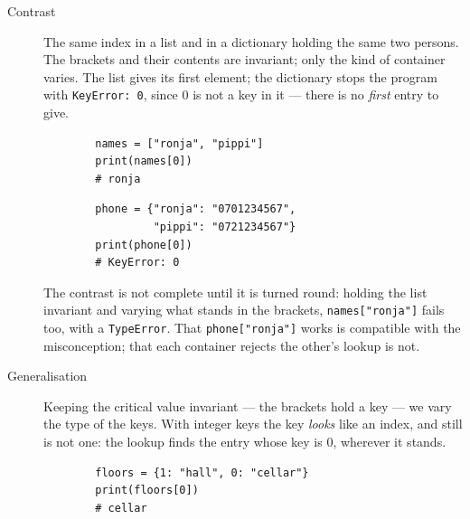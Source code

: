 \begin{description}
  \item[Contrast] The same index in a list and in a dictionary holding the
    same two persons. The brackets and their contents are invariant; only the
    kind of container varies. The list gives its first element; the dictionary
    stops the program with \texttt{KeyError: 0}, since 0 is not a
    key in it --- there is no \emph{first} entry to give.

    \hfill
    \begin{minipage}[t]{0.45\columnwidth}
      \begin{verbatim}
        names = ["ronja", "pippi"]
        print(names[0])
        # ronja
      \end{verbatim}
    \end{minipage}
    \hfill
    \begin{minipage}[t]{0.45\columnwidth}
      \begin{verbatim}
        phone = {"ronja": "0701234567",
                 "pippi": "0721234567"}
        print(phone[0])
        # KeyError: 0
      \end{verbatim}
    \end{minipage}
    \newline
    The contrast is not complete until it is turned round: holding the list
    invariant and varying what stands in the brackets,
    \texttt{names["ronja"]} fails too, with a
    \texttt{TypeError}. That
    \texttt{phone["ronja"]} works is compatible with the
    misconception; that each container rejects the other's lookup is not.

  \item[Generalisation] Keeping the critical value invariant --- the brackets
    hold a key --- we vary the type of the keys. With integer keys the key
    \emph{looks} like an index, and still is not one: the lookup finds the
    entry whose key is 0, wherever it stands.

    \hfill
    \begin{minipage}[t]{0.55\columnwidth}
      \begin{verbatim}
        floors = {1: "hall", 0: "cellar"}
        print(floors[0])
        # cellar
      \end{verbatim}
    \end{minipage}
    \hfill\null
\end{description}

